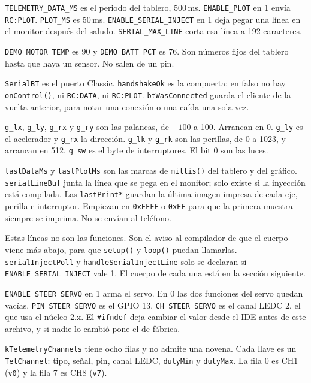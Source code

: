 \documentclass[11pt,a4paper]{article}
\newcommand{\nm}[1]{\textcolor{ArduinoName}{\texttt{#1}}}
\newcommand{\fnm}[1]{\textcolor{ArduinoFunc}{\texttt{#1}}}
\newcommand{\typ}[1]{\textcolor{ArduinoType}{\texttt{#1}}}
\newcommand{\kw}[1]{\textcolor{ArduinoControl}{\texttt{#1}}}
\newcommand{\str}[1]{\textcolor{ArduinoString}{\texttt{#1}}}
\newcommand{\sketchfile}{../../../ESP32_noCam/Classic_Simple/TeleCon_Classic_Simple/TeleCon_Classic_Simple.ino}
\newcommand{\inosnippet}[2]{%
  \par\addvspace{1.35em}%
}
\begin{document}
\nm{TELEMETRY\_DATA\_MS} es el periodo del tablero, 500\,ms.
\nm{ENABLE\_PLOT} en 1 envía \str{RC:PLOT}.
\nm{PLOT\_MS} es 50\,ms.
\nm{ENABLE\_SERIAL\_INJECT} en 1 deja pegar una línea en el monitor
después del saludo.
\nm{SERIAL\_MAX\_LINE} corta esa línea a 192 caracteres.

\nm{DEMO\_MOTOR\_TEMP} es 90 y \nm{DEMO\_BATT\_PCT} es 76.
Son números fijos del tablero hasta que haya un sensor.
No salen de un pin.

\inosnippet{47}{70}

\nm{SerialBT} es el puerto Classic. \nm{handshakeOk} es la
compuerta: en falso no hay \fnm{onControl()}, ni \str{RC:DATA},
ni \str{RC:PLOT}. \nm{btWasConnected} guarda el cliente de la
vuelta anterior, para notar una conexión o una caída una sola vez.

\nm{g\_lx}, \nm{g\_ly}, \nm{g\_rx} y \nm{g\_ry} son las
palancas, de $-100$ a 100. Arrancan en 0. \nm{g\_ly} es el
acelerador y \nm{g\_rx} la dirección. \nm{g\_lk} y
\nm{g\_rk} son las perillas, de 0 a 1023, y arrancan en 512.
\nm{g\_sw} es el byte de interruptores. El bit 0 son las luces.

\nm{lastDataMs} y \nm{lastPlotMs} son las marcas de
\fnm{millis()} del tablero y del gráfico. \nm{serialLineBuf}
junta la línea que se pega en el monitor; solo existe si la inyección
está compilada. Las \nm{lastPrint*} guardan la última imagen
impresa de cada eje, perilla e interruptor. Empiezan en \typ{0xFFFF}
o \typ{0xFF} para que la primera muestra siempre se imprima. No se
envían al teléfono.

\inosnippet{72}{84}

Estas líneas no son las funciones. Son el aviso al compilador de que
el cuerpo viene más abajo, para que \fnm{setup()} y \fnm{loop()}
puedan llamarlas. \fnm{serialInjectPoll} y
\fnm{handleSerialInjectLine} solo se declaran si
\nm{ENABLE\_SERIAL\_INJECT} vale 1. El cuerpo de cada una está en
la sección siguiente.

\inosnippet{87}{98}

\nm{ENABLE\_STEER\_SERVO} en 1 arma el servo. En 0 las dos
funciones del servo quedan vacías. \nm{PIN\_STEER\_SERVO} es el
GPIO 13. \nm{CH\_STEER\_SERVO} es el canal LEDC 2, el que usa el
núcleo 2.x. El \kw{\#ifndef} deja cambiar el valor desde el IDE
antes de este archivo, y si nadie lo cambió pone el de fábrica.

\inosnippet{100}{114}

\nm{kTelemetryChannels} tiene ocho filas y no admite una novena.
Cada llave es un \nm{TelChannel}: tipo, señal, pin, canal LEDC,
\nm{dutyMin} y \nm{dutyMax}. La fila 0 es CH1 (\str{v0}) y
la fila 7 es CH8 (\str{v7}).
\end{document}
